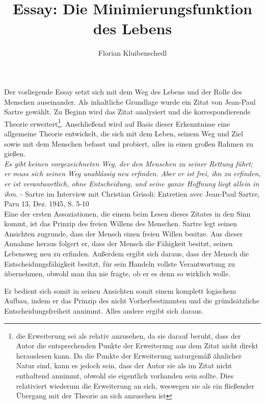 \documentclass[12pt,a4paper,oneside]{article}
\author{Florian Kluibenschedl}
\title{Essay: Die Minimierungsfunktion des Lebens}
\begin{document}
  \maketitle
  
  Der vorliegende Essay setzt sich mit dem Weg des Lebens und der Rolle des Menschen auseinander. Als inhaltliche Grundlage wurde ein Zitat von Jean-Paul Sartre gewählt. Zu Beginn wird das Zitat analysiert und die korrespondierende Theorie erweitert\footnote{die Erweiterung sei als relativ anzusehen, da sie darauf beruht, dass der Autor die entsprechenden Punkte der Erweiterung aus dem Zitat nicht direkt herauslesen kann. Da die Punkte der Erweiterung naturgemäß ähnlicher Natur sind, kann es jedoch sein, dass der Autor sie als im Zitat nicht enthaltend annimmt, obwohl sie eigentlich vorhanden sein sollte. Dies relativiert wiederum die Erweiterung an sich, weswegen sie als ein fließender Übergang mit der Theorie an sich anzusehen ist}. Anschließend wird auf Basis dieser Erkenntnisse eine allgemeine Theorie entwickelt, die sich mit dem Leben, seinem Weg und Ziel sowie mit dem Menschen befasst und probiert, alles in einen großen Rahmen zu gießen. \\
  
  \textit{\glqq Es gibt keinen vorgezeichneten Weg, der den Menschen zu seiner Rettung führt; er muss sich seinen Weg unablässig neu erfinden. Aber er ist frei, ihn zu erfinden, er ist verantwortlich, ohne Entscheidung, und seine ganze Hoffnung liegt allein in ihm.\grqq} - Sartre im Interview mit Christian Grisoli: \glqq Entretien avec Jean-Paul Sartre\grqq , Paru 13, Dez. 1945, S. 5-10 \\
  
  Eine der ersten Assoziationen, die einem beim Lesen dieses Zitates in den Sinn kommt, ist das Prinzip des freien Willens des Menschen. Sartre legt seinen Ansichten zugrunde, dass der Mensch einen freien Willen besitze. Aus dieser Annahme heraus folgert er, dass der Mensch die Fähigkeit besitzt, seinen Lebensweg neu zu erfinden. Außerdem ergibt sich daraus, dass der Mensch die Entscheidungsfähigkeit besitzt, für sein Handeln vollste Verantwortung zu übernehmen, obwohl man ihn nie fragte, ob er es denn so wirklich wolle. 
  
  Er bedient sich somit in seinen Ansichten somit einem komplett logischem Aufbau, indem er das Prinzip des nicht Vorherbestimmten und die gründsätzliche Entscheidungsfreiheit annimmt. Alles andere ergibt sich daraus. \\
  
\end{document}
